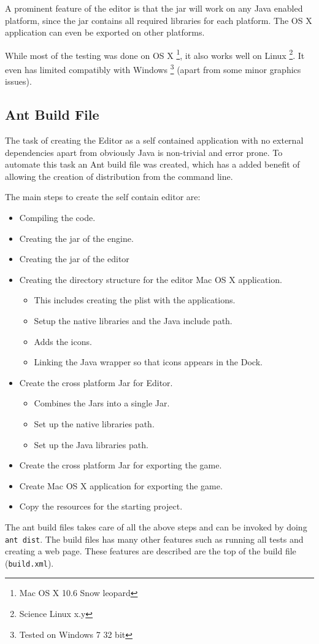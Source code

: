 A prominent feature of the editor is that the jar will work on any Java enabled platform, since the jar contains all required libraries for each platform. The OS X application can even be exported on other platforms.

While most of the testing was done on OS X \footnote{Mac OS X 10.6 Snow leopard}, it also works well on Linux \footnote{Science  Linux x.y}. It  even has limited compatibly with Windows \footnote{Tested on Windows 7 32 bit} (apart from some minor graphics issues).

\subsection{Ant Build File}

The task of creating the Editor as a self contained application with no external dependencies apart from obviously Java is non-trivial and error prone.  To automate this task an Ant build file was created, which has a added benefit of allowing the creation of distribution from the command line. 

The main steps to create the self contain editor are:
\begin{itemize}
	\item Compiling the code.
	\item Creating the jar of the engine.
	\item Creating the jar of the editor
	\item Creating the directory structure for the editor Mac OS X application.
	\begin{itemize}[topsep=0mm,noitemsep ]
		\item This includes creating the plist\cite{plist} with the applications.
		\item Setup the native libraries and the Java include path.
		\item Adds the icons.
		\item Linking the Java wrapper so that icons appears in the Dock.
	\end{itemize}
	\item Create the cross platform Jar for Editor. 
	\begin{itemize}[topsep=0mm,noitemsep ]
		\item Combines the Jars into a single Jar.
		\item Set up the native libraries path.
		\item Set up the Java libraries path.
	\end{itemize}
	\item Create the cross platform Jar for exporting the game.
	\item Create Mac OS X application for exporting the game.
	\item Copy the resources for the starting project.
\end{itemize}

The ant build files takes care of all the above steps and can be invoked by doing \lstinline{ant dist}. The build files has many other features such as running all tests and creating a web page. These features are described are the top of the build file (\texttt{build.xml}).
